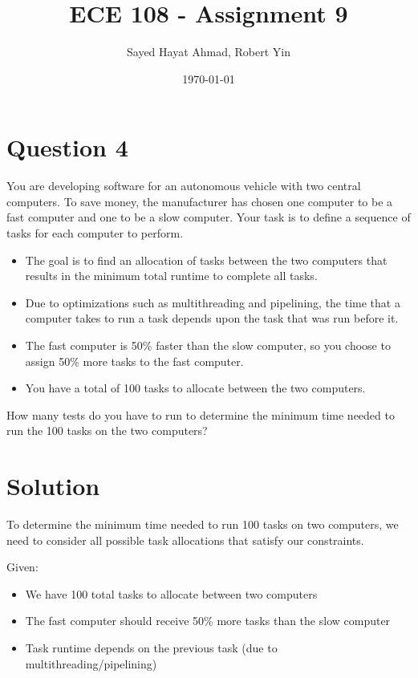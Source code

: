 \documentclass{article}
\title{ECE 108 - Assignment 9}
\author{Sayed Hayat Ahmad, Robert Yin}
\date{\today}
\begin{document}
\maketitle

\section*{Question 4}

You are developing software for an autonomous vehicle with two central computers. To save money, the manufacturer has chosen one computer to be a fast computer and one to be a slow computer. Your task is to define a sequence of tasks for each computer to perform.

\begin{itemize}
    \item The goal is to find an allocation of tasks between the two computers that results in the minimum total runtime to complete all tasks.
    \item Due to optimizations such as multithreading and pipelining, the time that a computer takes to run a task depends upon the task that was run before it.
    \item The fast computer is 50\% faster than the slow computer, so you choose to assign 50\% more tasks to the fast computer.
    \item You have a total of 100 tasks to allocate between the two computers.
\end{itemize}

How many tests do you have to run to determine the minimum time needed to run the 100 tasks on the two computers?

\section*{Solution}
To determine the minimum time needed to run 100 tasks on two computers, we need to consider all possible task allocations that satisfy our constraints.

Given:
\begin{itemize}
    \item We have 100 total tasks to allocate between two computers
    \item The fast computer should receive 50\% more tasks than the slow computer
    \item Task runtime depends on the previous task (due to multithreading/pipelining)
\end{itemize}
\end{document}
